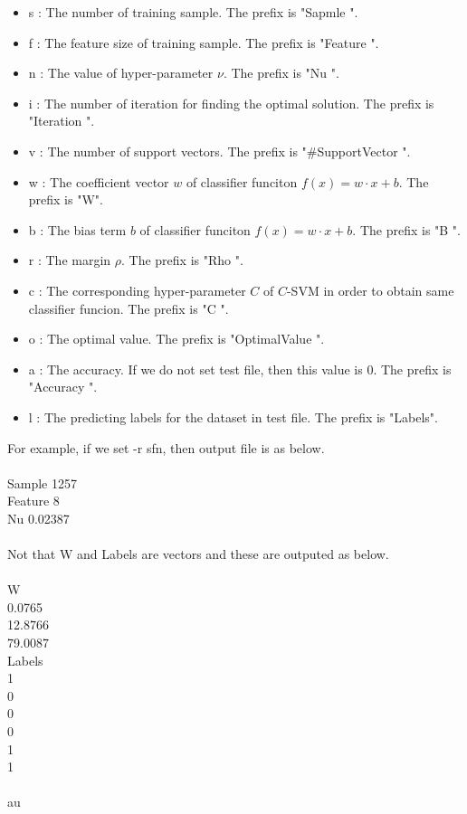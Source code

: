\documentclass[11pt,a4paper]{article}
\begin{document}
\begin{itemize}
\item s : The number of training sample. The prefix is "Sapmle ".
\item f : The feature size of training sample. The prefix is "Feature ".
\item n : The value of hyper-parameter $\nu$. The prefix is "Nu ".
\item i : The number of iteration for finding the optimal solution. The prefix is "Iteration ".
\item v : The number of support vectors. The prefix is "\#SupportVector ".
\item w : The coefficient vector $w$ of classifier funciton $f(x)=w\cdot x + b$. The prefix is "W".
\item b : The bias term $b$ of classifier funciton $f(x)=w\cdot x + b$. The prefix is "B ".
\item r : The margin $\rho$. The prefix is "Rho ".
\item c : The corresponding hyper-parameter $C$ of $C$-SVM in order to obtain same classifier funcion. The prefix is "C ".
\item o : The optimal value. The prefix is "OptimalValue ".
\item a : The accuracy. If we do not set test file, then this value is $0$. The prefix is "Accuracy ".
\item l : The predicting labels for the dataset in test file. The prefix is "Labels".
\end{itemize}

For example,
if we set -r sfn,
then output file is as below.\\
\\
Sample 1257\\
Feature 8\\
Nu 0.02387\\
\\
Not that W and Labels are vectors and these are outputed as below.\\
\\
W\\
0.0765\\
12.8766\\
79.0087\\
Labels\\
1\\
0\\
0\\
0\\
1\\
1\\
\\
au
\end{document}
